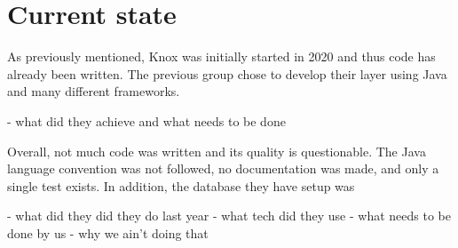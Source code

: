 \section{Current state}

As previously mentioned, Knox was initially started in 2020 and thus code has already been written.
The previous group chose to develop their layer using Java and many different frameworks.

- what did they achieve and what needs to be done

Overall, not much code was written and its quality is questionable. 
The Java language convention was not followed, no documentation was made, and only a single test exists. 
In addition, the database they have setup was 

- what did they did they do last year
- what tech did they use
- what needs to be done by us
- why we ain't doing that